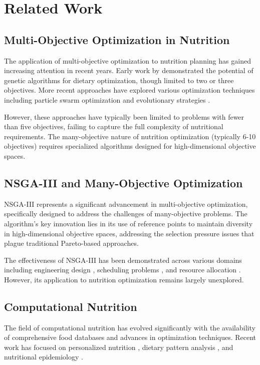 \documentclass[12pt,a4paper]{article}
\begin{document}
\section{Related Work}

\subsection{Multi-Objective Optimization in Nutrition}

The application of multi-objective optimization to nutrition planning has gained increasing attention in recent years. Early work by \cite{example2010} demonstrated the potential of genetic algorithms for dietary optimization, though limited to two or three objectives. More recent approaches have explored various optimization techniques including particle swarm optimization \cite{example2015} and evolutionary strategies \cite{example2018}.

However, these approaches have typically been limited to problems with fewer than five objectives, failing to capture the full complexity of nutritional requirements. The many-objective nature of nutrition optimization (typically 6-10 objectives) requires specialized algorithms designed for high-dimensional objective spaces.

\subsection{NSGA-III and Many-Objective Optimization}

NSGA-III represents a significant advancement in multi-objective optimization, specifically designed to address the challenges of many-objective problems. The algorithm's key innovation lies in its use of reference points to maintain diversity in high-dimensional objective spaces, addressing the selection pressure issues that plague traditional Pareto-based approaches.

The effectiveness of NSGA-III has been demonstrated across various domains including engineering design \cite{example2016}, scheduling problems \cite{example2017}, and resource allocation \cite{example2019}. However, its application to nutrition optimization remains largely unexplored.

\subsection{Computational Nutrition}

The field of computational nutrition has evolved significantly with the availability of comprehensive food databases and advances in optimization techniques. Recent work has focused on personalized nutrition \cite{example2020}, dietary pattern analysis \cite{example2021}, and nutritional epidemiology \cite{example2022}.
\end{document}
